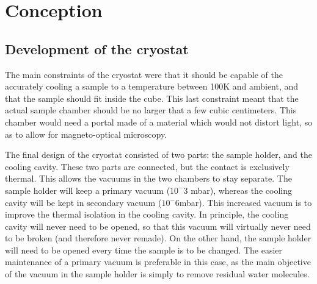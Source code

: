 \documentclass[journal]{IEEEtran}
\begin{document}
%




\section{Conception}
\subsection{Development of the cryostat}
The main constraints of the cryostat were that it should be capable of the accurately cooling a sample to a temperature between 100K and ambient, and that the sample should fit inside the cube. This last constraint meant that the actual sample chamber should be no larger that a few cubic centimeters. This chamber would need a portal made of a material which would not distort light, so as to allow for magneto-optical microscopy.

The final design of the cryostat consisted of two parts: the sample holder, and the cooling cavity. These two parts are connected, but the contact is exclusively thermal. This allows the vacuums in the two chambers to stay separate. The sample holder will keep a primary vacuum ($10^-3$ mbar), whereas the cooling cavity will be kept in secondary vacuum ($10^-6$mbar). This increased vacuum is to improve the thermal isolation in the cooling cavity. In principle, the cooling cavity will never need to be opened, so that this vacuum will virtually never need to be broken (and therefore never remade). On the other hand, the sample holder will need to be opened every time the sample is to be changed. The easier maintenance of a primary vacuum is preferable in this case, as the main objective of the vacuum in the sample holder is simply to remove residual water molecules.
\end{document}

